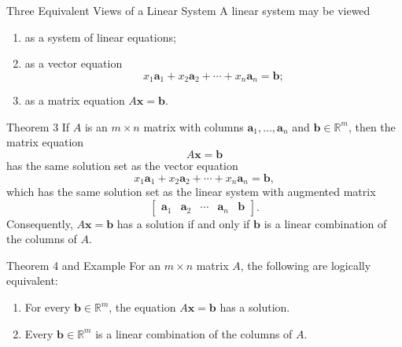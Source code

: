 \begin{frame}{Three Equivalent Views of a Linear System}
  A linear system may be viewed
  \begin{enumerate}
    \item as a system of linear equations;
    \item as a vector equation
      \[
        x_1\mathbf{a}_1+x_2\mathbf{a}_2+\cdots+x_n\mathbf{a}_n=\mathbf{b};
      \]
    \item as a matrix equation $A\mathbf{x}=\mathbf{b}$.
  \end{enumerate}
\end{frame}

\begin{frame}{Theorem 3}
  If $A$ is an $m\times n$ matrix with columns
  $\mathbf{a}_1,\ldots,\mathbf{a}_n$ and $\mathbf{b}\in\mathbb{R}^m$, then
  the matrix equation
  \[
    A\mathbf{x}=\mathbf{b}
  \]
  has the same solution set as the vector equation
  \[
    x_1\mathbf{a}_1+x_2\mathbf{a}_2+\cdots+x_n\mathbf{a}_n=\mathbf{b},
  \]
  which has the same solution set as the linear system with augmented matrix
  \[
    \begin{bmatrix}\mathbf{a}_1&\mathbf{a}_2&\cdots&\mathbf{a}_n&\mathbf{b}\end{bmatrix}.
  \]
  Consequently, $A\mathbf{x}=\mathbf{b}$ has a solution if and only if
  $\mathbf{b}$ is a linear combination of the columns of $A$.
\end{frame}

\begin{frame}{Theorem 4 and Example}
  For an $m\times n$ matrix $A$, the following are logically equivalent:
  \begin{enumerate}
    \item For every $\mathbf{b}\in\mathbb{R}^m$, the equation
          $A\mathbf{x}=\mathbf{b}$ has a solution.
    \item Every $\mathbf{b}\in\mathbb{R}^m$ is a linear combination of the
          columns of $A$.
  \end{enumerate}
  
\end{frame}

